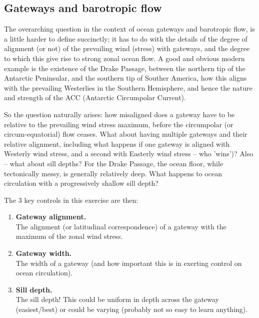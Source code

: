 
\subsection{Gateways and barotropic flow}

The overarching question in the context of ocean gateways and barotropic flow, is a little harder to define succinctly; it has to do with the details of the degree of alignment (or not) of the prevailing wind (stress)
with  gateways, and the degree to which this give rise to strong zonal ocean flow. A good and obvious modern example is the existence of the Drake Passage, between the northern tip of the Antarctic Peninsular, and the southern tip of Souther America, how this aligns with the prevailing Westerlies in the Southern Hemisphere, and hence the nature and strength of the ACC (Antarctic Circumpolar Current).

So the question naturally arises: how misaligned does a gateway have to be relative to the prevailing wind stress maximum, before the circumpolar (or circum-equatorial) flow ceases. What about having multiple gateways and their relative alignment, including what happens if one gateway is aligned with Westerly wind stress, and a second with Easterly wind stress -- who 'wins')? Also -- what about sill depths? For the Drake Passage, the ocean floor, while tectonically messy, is generally relatively deep. What happens to ocean circulation with a progressively shallow sill depth?

\newpage

The 3 key controls in this exercise are then:
\vspace{1mm}

\begin{enumerate}
\vspace{1mm}
\item \textbf{Gateway alignment.}
\\The  alignment (or latitudinal correspondence) of a gateway with the maximum of the zonal wind stress.
\vspace{1mm}
\item \textbf{Gateway width.}
\\The width of a gateway (and how important this is in exerting control on ocean circulation).
\vspace{1mm}
\item \textbf{Sill depth.}
\\The sill depth! This could be uniform in depth across the gateway (easiest/best) or could be varying (probably not so easy to learn anything).
\end{enumerate}
\vspace{2mm}

